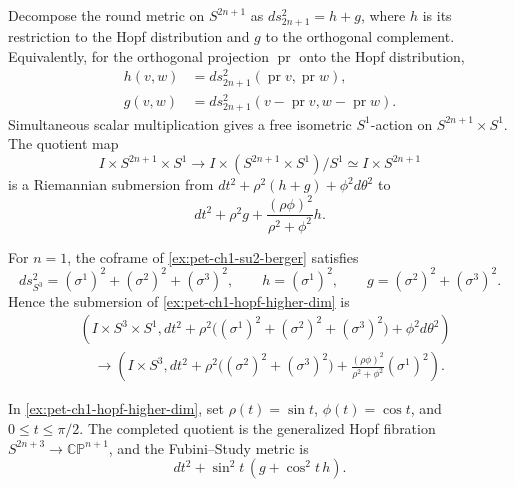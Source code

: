 \begin{example}
  \label{ex:pet-ch1-hopf-higher-dim}
  \leanok
  Decompose the round metric on $S^{2n+1}$ as $ds_{2n+1}^2=h+g$, where $h$
  is its restriction to the Hopf distribution and $g$ to the orthogonal
  complement. Equivalently, for the orthogonal projection $\operatorname{pr}$
  onto the Hopf distribution,
  \[
  \begin{aligned}
    h(v,w)&=ds_{2n+1}^2(\operatorname{pr}v,\operatorname{pr}w),\\
    g(v,w)&=ds_{2n+1}^2(v-\operatorname{pr}v,w-\operatorname{pr}w).
  \end{aligned}
  \]
  Simultaneous scalar multiplication gives a free isometric $S^1$-action on
  $S^{2n+1}\times S^1$. The quotient map
  \[
    I\times S^{2n+1}\times S^1
      \longrightarrow I\times (S^{2n+1}\times S^1)/S^1
      \simeq I\times S^{2n+1}
  \]
  is a Riemannian submersion from
  $dt^2+\rho^2(h+g)+\phi^2d\theta^2$ to
  \[
    dt^2+\rho^2g+\frac{(\rho\phi)^2}{\rho^2+\phi^2}h.
  \]
\end{example}

\begin{example}
  \label{ex:pet-ch1-hopf-su2-coframe}
  \leanok
  For $n=1$, the coframe of \cref{ex:pet-ch1-su2-berger} satisfies
  \[
    ds_{S^3}^2=(\sigma^1)^2+(\sigma^2)^2+(\sigma^3)^2,
    \qquad h=(\sigma^1)^2,
    \qquad g=(\sigma^2)^2+(\sigma^3)^2.
  \]
  Hence the submersion of \cref{ex:pet-ch1-hopf-higher-dim} is
  \[
  \begin{aligned}
   &\left(I\times S^3\times S^1,
     dt^2+\rho^2\big((\sigma^1)^2+(\sigma^2)^2+(\sigma^3)^2\big)
       +\phi^2d\theta^2\right)\\
   &\quad\longrightarrow
    \left(I\times S^3,
     dt^2+\rho^2\big((\sigma^2)^2+(\sigma^3)^2\big)
       +\frac{(\rho\phi)^2}{\rho^2+\phi^2}(\sigma^1)^2\right).
  \end{aligned}
  \]
\end{example}

\begin{example}
  \label{ex:pet-ch1-generalized-hopf}
  \leanok
  In \cref{ex:pet-ch1-hopf-higher-dim}, set
  $\rho(t)=\sin t$, $\phi(t)=\cos t$, and $0\le t\le\pi/2$. The completed
  quotient is the generalized Hopf fibration
  $S^{2n+3}\to\mathbb{CP}^{n+1}$, and the Fubini--Study metric is
  \[
    dt^2+\sin^2t\,(g+\cos^2t\,h).
  \]
\end{example}

